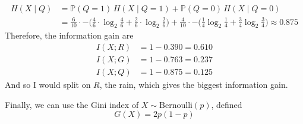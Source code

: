 \documentclass{article}
\begin{document}
\begin{example}
\begin{align*}
        H(X \mid Q ) & = \mathbb{P}(Q = 1)\, H(X \mid Q = 1) + \mathbb{P}(Q = 0) \, H(X \mid Q = 0) \\
        & = \frac{6}{10} \cdot - \big( \frac{4}{6} \cdot \log_2 \frac{4}{6} + \frac{2}{6} \cdot \log_2 \frac{2}{6} \big) + \frac{4}{10} \cdot - \big( \frac{1}{4} \log_2 \frac{1}{4} + \frac{3}{4} \log_2 \frac{3}{4} \big) \approx 0.875
    \end{align*}
    Therefore, the information gain are 
    \begin{align*}
        I(X; R) & = 1 - 0.390 = 0.610 \\
        I(X; G) & = 1 - 0.763 = 0.237 \\
        I(X; Q) & = 1 - 0.875 = 0.125 
    \end{align*}
    And so I would split on $R$, the rain, which gives the biggest information gain. 
    \end{example}

    Finally, we can use the Gini index of $X \sim \mathrm{Bernoulli}(p)$, defined 
    \begin{equation}
      G(X) = 2 p (1 - p)
    \end{equation}
\end{document}
